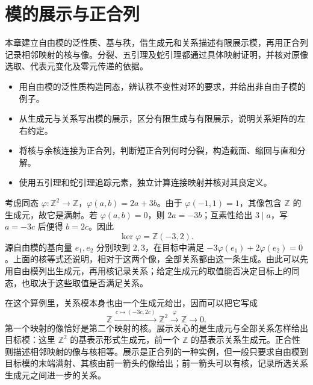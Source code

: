 
\chapter{模的展示与正合列}
\label{b2:ch:03}

\begin{chapterabstract}
	本章建立自由模的泛性质、基与秩，借生成元和关系描述有限展示模，再用正合列记录相邻映射的核与像。分裂、五引理及蛇引理都通过具体映射证明，并核对原像选取、代表元变化及零元传递的依据。
\end{chapterabstract}

\begin{learninggoals}
	\begin{itemize}
		\item 用自由模的泛性质构造同态，辨认秩不变性对环的要求，并给出非自由子模的例子。
		\item 从生成元与关系写出模的展示，区分有限生成与有限展示，说明关系矩阵的左右约定。
		\item 将核与余核连接为正合列，判断短正合列何时分裂，构造截面、缩回与直和分解。
		\item 使用五引理和蛇引理追踪元素，独立计算连接映射并核对其良定义。
	\end{itemize}
\end{learninggoals}

考虑同态 \(\varphi:\mathbb Z^2\to\mathbb Z\)，\(\varphi(a,b)=2a+3b\)。由于 \(\varphi(-1,1)=1\)，其像包含 \(\mathbb Z\) 的生成元，故它是满射。若 \(\varphi(a,b)=0\)，则 \(2a=-3b\)；互素性给出 \(3\mid a\)，写 \(a=-3c\) 后便得 \(b=2c\)。因此
\[
	\ker\varphi=\mathbb Z(-3,2).
\]
源自由模的基向量 \(e_1,e_2\) 分别映到 \(2,3\)，在目标中满足 \(-3\varphi(e_1)+2\varphi(e_2)=0\)。上面的核等式还说明，相对于这两个像，全部关系都由这一条生成。由此可以先用自由模列出生成元，再用核记录关系；给定生成元的取值能否决定目标上的同态，也取决于这些取值是否满足关系。

\ProseParagraphBreak

在这个算例里，关系模本身也由一个生成元给出，因而可以把它写成
\[
	\mathbb Z\xrightarrow{\,c\mapsto(-3c,2c)\,}\mathbb Z^2 \xrightarrow{\,\varphi\,}\mathbb Z\longrightarrow0.
\]
第一个映射的像恰好是第二个映射的核。展示关心的是生成元与全部关系怎样给出目标模：这里 \(\mathbb Z^2\) 的基表示形式生成元，前一个 \(\mathbb Z\) 的基表示关系生成元。正合性则描述相邻映射的像与核相等。展示是正合列的一种实例，但一般只要求自由模到目标模的末端满射、其核由前一箭头的像给出；前一箭头可以有核，记录所选关系生成元之间进一步的关系。

